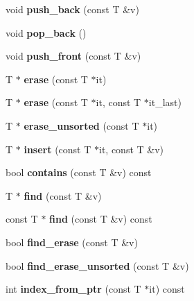 \begin{DoxyCompactItemize}
void {\bfseries push\+\_\+back} (const T \&v)
\item 
\mbox{\label{structImVector_a3db7ce62d3c429effdb893fbf7148c1c}} 
void {\bfseries pop\+\_\+back} ()
\item 
\mbox{\label{structImVector_a168658df8e0e1df5698ebe7a69946389}} 
void {\bfseries push\+\_\+front} (const T \&v)
\item 
\mbox{\label{structImVector_af44d62675eb411f655da9cced5237456}} 
T $\ast$ {\bfseries erase} (const T $\ast$it)
\item 
\mbox{\label{structImVector_a061554df4aff14deece181d6c46abb9f}} 
T $\ast$ {\bfseries erase} (const T $\ast$it, const T $\ast$it\+\_\+last)
\item 
\mbox{\label{structImVector_af3bb8157615f4d38b1faf04a5e11b96f}} 
T $\ast$ {\bfseries erase\+\_\+unsorted} (const T $\ast$it)
\item 
\mbox{\label{structImVector_a7859d07f4a90efd2d9fd9ad5c1bf43c6}} 
T $\ast$ {\bfseries insert} (const T $\ast$it, const T \&v)
\item 
\mbox{\label{structImVector_a2e7860fbde1c721f168b6262d8f14aec}} 
bool {\bfseries contains} (const T \&v) const
\item 
\mbox{\label{structImVector_a1fd56218ff1441843df8c9f1aef54fdc}} 
T $\ast$ {\bfseries find} (const T \&v)
\item 
\mbox{\label{structImVector_ada7d8e0e66b8619562cb2fa3830c8f8d}} 
const T $\ast$ {\bfseries find} (const T \&v) const
\item 
\mbox{\label{structImVector_a4e9214ecaa413240f76223500dbed912}} 
bool {\bfseries find\+\_\+erase} (const T \&v)
\item 
\mbox{\label{structImVector_a07f501e40783436616156682ec668327}} 
bool {\bfseries find\+\_\+erase\+\_\+unsorted} (const T \&v)
\item 
\mbox{\label{structImVector_a3fd48379f807eeb01fb9da39afa30dc7}} 
int {\bfseries index\+\_\+from\+\_\+ptr} (const T $\ast$it) const
\end{DoxyCompactItemize}
